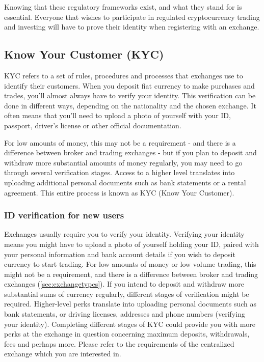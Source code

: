 Knowing that these regulatory frameworks exist, and what they stand for is essential. Everyone that wishes to participate in regulated cryptocurrency trading and investing will have to prove their identity when registering with an exchange.

\subsection{Know Your Customer (KYC)}
\label{par:KYC}
KYC refers to a set of rules, procedures and processes that exchanges use to identify their customers. When you deposit fiat currency to make purchases and trades, you'll almost always have to verify your identity. This verification can be done in different ways, depending on the nationality and the chosen exchange. It often means that you'll need to upload a photo of yourself with your ID, passport, driver's license or other official documentation.

For low amounts of money, this may not be a requirement - and there is a difference between broker and trading exchanges - but if you plan to deposit and withdraw more substantial amounts of money regularly, you may need to go through several verification stages. Access to a higher level translates into uploading additional personal documents such as bank statements or a rental agreement. This entire process is known as KYC (Know Your Customer).

\subsubsection{ID verification for new users}
Exchanges usually require you to verify your identity. Verifying your identity means you might have to upload a photo of yourself holding your ID, paired with your personal information and bank account details if you wish to deposit currency to start trading. For low amounts of money or low volume trading, this might not be a requirement, and there is a difference between broker and trading exchanges (\cref{sec:exchangetypes}). If you intend to deposit and withdraw more substantial sums of currency regularly, different stages of verification might be required. Higher-level perks translate into uploading personal documents such as bank statements, or driving licenses, addresses and phone numbers (verifying your identity). Completing different stages of KYC could provide you with more perks at the exchange in question concerning maximum deposits, withdrawals, fees and perhaps more. Please refer to the requirements of the centralized exchange which you are interested in. \medskip


